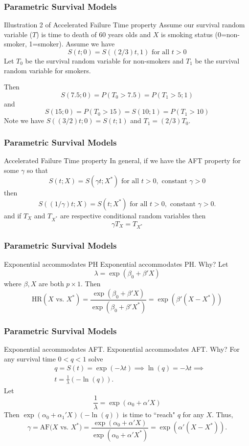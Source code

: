 \documentclass{beamer}
\theoremstyle{definition}
\begin{document}
\begin{frame}
\frametitle{Parametric Survival Models}
\begin{block}{Illustration 2 of Accelerated Failure Time property}
Assume our survival random variable ($T$) is time to death of 60 years olds and $X$ is smoking status (0=non-smoker, 1=smoker).
Assume we have
\[
S(t;0) = S((2/3)t,1) \text{ for all } t>0
\]
Let $T_0$ be the survival random variable for non-smokers and $T_1$ be the survival random variable for smokers.

Then
\[ S(7.5;0) = P(T_0>7.5) = P(T_1>5;1) \]
 and
\[S(15;0) = P(T_0>15) = S(10;1) = P(T_1>10)
\]
Note we have $S((3/2)t;0) = S(t;1)$ and $T_1=(2/3)T_0$.
\end{block}
\end{frame}


\begin{frame}
\frametitle{Parametric Survival Models}
\begin{block}{Accelerated Failure Time property}
In general, if we have the AFT property for some $\gamma$ so that
\[ S(t;X) =  S(\gamma t;X^*)  \text{ for all } t>0, \text{ constant } \gamma > 0
\]
then
 \[ S((1/\gamma)t;X) =  S( t;X^*)  \text{ for all } t>0, \text{ constant } \gamma > 0.
\]
and if $T_X$ and $T_{X^*}$ are respective conditional random variables then
\[
\gamma T_X = T_{X^*}
\]
\end{block}
\end{frame}

\begin{frame}
\frametitle{Parametric Survival Models}
\begin{block}{Exponential accommodates PH}
Exponential accommodates PH. Why? Let
\[
\lambda=\exp(\beta_0 + \beta' X)
\] where $\beta, X$ are both $p \times 1$.
Then
\[
\text{HR}(X \text{ vs. } X^*)  = \dfrac{\exp(\beta_0 + \beta' X)}{\exp(\beta_0 + \beta' X^*)} = \exp(\beta'(X - X^*))
\]
\end{block}
\end{frame}

\begin{frame}
\frametitle{Parametric Survival Models}
\begin{block}{Exponential accommodates AFT.}
Exponential accommodates AFT. Why? For any survival time $0 < q < 1$ solve
\begin{align*}
& q = S(t) = \exp(- \lambda t) \implies \ln(q) = - \lambda t \implies \\
& t = \frac{1}{\lambda} (- \ln(q)).
\end{align*}
Let
\[
\frac{1}{\lambda} = \exp(\alpha_0 + \alpha'X)
\]
Then $\exp(\alpha_0 + \alpha_1'X)(- \ln(q))$ is time to ``reach" $q$ for any $X$. Thus,
\vspace{-10pt}
\[
\gamma = \text{AF($X$ vs. $X^*$)} = \frac{\exp(\alpha_0 + \alpha'X)}{\exp(\alpha_0 + \alpha'X^*)} = \exp(\alpha'(X-X^*)).
\]
\end{block}
\end{frame}
\end{document}
